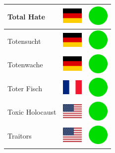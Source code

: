 \documentclass[12pt, a4paper, twoside]{report}
\begin{document}
\begin{center}
\begin{longtable}{|p{5cm}|p{2cm}|p{2cm}|}
 Total Hate                                                 & \includegraphics[width=1cm]{../4x3/de} &   \includegraphics[width=1cm]{../likes/y} \\ \hline
 Totensucht                                                 & \includegraphics[width=1cm]{../4x3/de} &   \includegraphics[width=1cm]{../likes/y} \\ \hline
 Totenwache                                                 & \includegraphics[width=1cm]{../4x3/de} &   \includegraphics[width=1cm]{../likes/y} \\ \hline
 Toter Fisch                                                & \includegraphics[width=1cm]{../4x3/fr} &   \includegraphics[width=1cm]{../likes/y} \\ \hline
 Toxic Holocaust                                            & \includegraphics[width=1cm]{../4x3/us} &   \includegraphics[width=1cm]{../likes/y} \\ \hline
 Traitors                                                   & \includegraphics[width=1cm]{../4x3/us} &   \includegraphics[width=1cm]{../likes/y} \\ \hline

\end{longtable}
\end{center}
\end{document}
